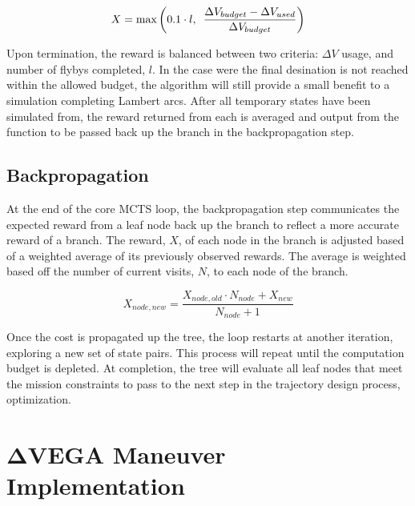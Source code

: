 \documentclass[letterpaper, preprint, paper,11pt]{AAS}	%
\begin{document}
\begin{equation}
    \label{eq:simCost1}
    X = \text{max}\left( 0.1 \cdot l,\hspace{0.5em} \frac{\Delta V_{budget} - \Delta V_{used}}{\Delta V_{budget}} \right)
\end{equation}

Upon termination, the reward is balanced between two criteria: $\Delta V$ usage, and number of flybys completed, $l$. In the case were the final desination is not reached within the allowed budget, the algorithm will still provide a small benefit to a simulation completing Lambert arcs. After all temporary states have been simulated from, the reward returned from each is averaged and output from the function to be passed back up the branch in the backpropagation step.

\subsection{Backpropagation}

At the end of the core MCTS loop, the backpropagation step communicates the expected reward from a leaf node back up the branch to reflect a more accurate reward of a branch. The reward, $X$, of each node in the branch is adjusted based of a weighted average of its previously observed rewards. The average is weighted based off the number of current visits, $N$, to each node of the branch.

\begin{equation}
    \label{eq:bp}
    X_{node, new} = \frac{X_{node, old} \cdot N_{node} + X_{new}}{N_{node} + 1}
\end{equation}

Once the cost is propagated up the tree, the loop restarts at another iteration, exploring a new set of state pairs. This process will repeat until the computation budget is depleted. At completion, the tree will evaluate all leaf nodes that meet the mission constraints to pass to the next step in the trajectory design process, optimization.

\section{$\boldsymbol{\Delta V}$EGA Maneuver Implementation}
\end{document}
